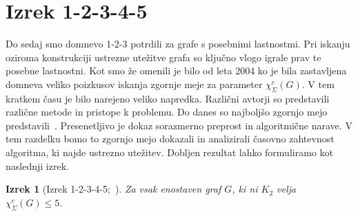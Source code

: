 \documentclass[12pt,a4paper,twoside]{article}
\theoremstyle{definition} %
\theoremstyle{plain} %
\newtheorem{izrek}[definicija]{Izrek}
\newcommand{\ec}{\chi_{\Sigma}^e}
\numberwithin{equation}{section}  %
\begin{document}
 \section{Izrek 1-2-3-4-5}
Do sedaj smo domnevo 1-2-3 potrdili za grafe s posebnimi lastnostmi. Pri iskanju oziroma konstrukciji ustrezne utežitve grafa so ključno vlogo igrale prav te posebne lastnostni.  Kot smo že omenili je bilo od leta 2004 ko je bila zastavljena domneva veliko poizkusov iskanja zgornje meje za parameter $\ec(G)$. V tem kratkem času je bilo narejeno veliko napredka. Različni avtorji so predstavili različne metode in pristope k problemu. Do danes so najboljšo zgornjo mejo predstavili~\citet{proof12345}. Presenetljivo je dokaz sorazmerno preprost in algoritmične narave. V tem razdelku bomo to zgornjo mejo dokazali in analizirali časovno zahtevnost algoritma, ki najde ustrezno utežitev. Dobljen rezultat lahko formuliramo kot naslednji izrek.

 
 \begin{izrek}[Izrek 1-2-3-4-5;~\citet{proof12345}]
\label{theorem12345}
 	Za vsak enostaven graf $G$, ki ni $K_2$ velja $\ec(G) \le 5$.
 \end{izrek}
\end{document}
